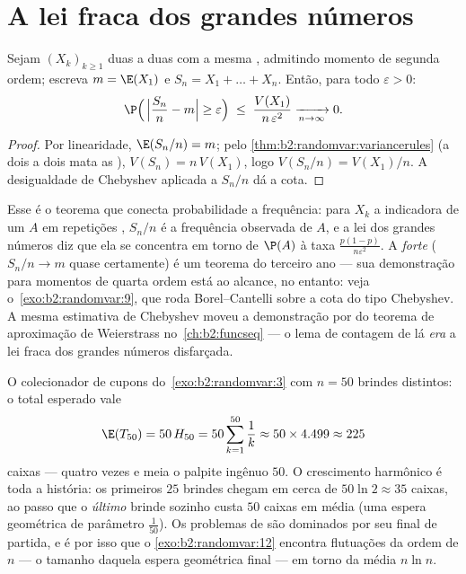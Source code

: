 \section{A lei fraca dos grandes números}

\begin{theorem}\label{thm:b2:randomvar:lln}
Sejam $(X_k)_{k \geq 1}$   duas a duas
com a mesma , admitindo momento de segunda ordem; escreva $m = \E(X_1)$
e $S_n = X_1 + \dots + X_n$. Então, para todo $\varepsilon > 0$:
\[
\P\Bigl(\,\Bigl|\frac{S_n}{n} - m\Bigr| \geq \varepsilon\Bigr)
\;\leq\; \frac{V(X_1)}{n\,\varepsilon^2}
\xrightarrow[n \to \infty]{} 0 .
\]
\end{theorem}

\begin{proof}
Por linearidade, $\E(S_n/n) = m$; pelo
\cref{thm:b2:randomvar:variancerules} (a  dois a dois
mata as ), $V(S_n) = n\,V(X_1)$, logo $V(S_n/n) =
V(X_1)/n$. A desigualdade de Chebyshev aplicada a $S_n/n$ dá a
cota.
\end{proof}

\begin{remark}
Esse é o teorema que conecta probabilidade a frequência: para
$X_k$ a indicadora de um  $A$ em repetições ,
$S_n/n$ é a frequência observada de $A$, e a lei dos grandes
números diz que ela se concentra em torno de $\P(A)$ à taxa
$\frac{p(1-p)}{n\varepsilon^2}$. A  \emph{forte} ($S_n/n \to
m$ quase certamente) é um teorema do terceiro ano --- sua demonstração para
momentos de quarta ordem está ao alcance, no entanto: veja o~\cref{exo:b2:randomvar:9},
que roda Borel--Cantelli sobre a cota do tipo Chebyshev. A mesma
estimativa de Chebyshev moveu a demonstração por  do
teorema de aproximação de Weierstrass no~\cref{ch:b2:funcseq} --- o
lema de contagem de lá \emph{era} a lei fraca dos grandes números
disfarçada.
\end{remark}

\begin{example}
\label{ex:b2:randomvar:couponnumeric}
O colecionador de cupons do~\cref{exo:b2:randomvar:3} com $n =
50$ brindes distintos: o total esperado vale
\[
\E(T_{50}) = 50\,H_{50} = 50\sum_{k=1}^{50}\frac1k
\approx 50 \times 4.499 \approx 225
\]
caixas --- quatro vezes e meia o palpite ingênuo $50$. O
crescimento harmônico é toda a história: os primeiros $25$ brindes
chegam em cerca de $50\ln2 \approx 35$ caixas, ao passo que o
\emph{último} brinde sozinho custa $50$ caixas em média (uma
espera geométrica de parâmetro $\frac1{50}$). Os problemas
de  são dominados por seu final de partida, e é por isso que o
\cref{exo:b2:randomvar:12} encontra flutuações da ordem de $n$
--- o tamanho daquela espera geométrica final --- em torno da
média $n\ln n$.
\end{example}

